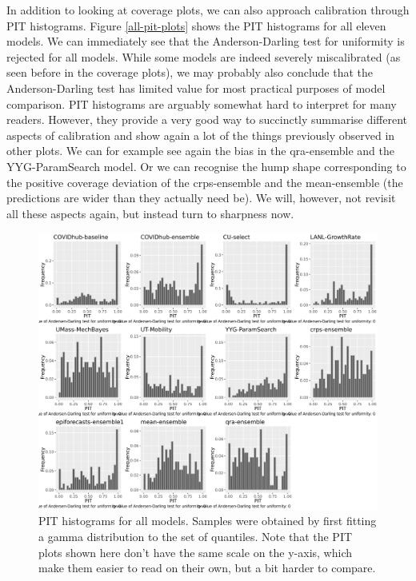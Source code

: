 \documentclass[
]{book}
\begin{document}
In addition to looking at coverage plots, we can also approach calibration through PIT histograms. Figure \ref{all-pit-plots} shows the PIT histograms for all eleven models. We can immediately see that the Anderson-Darling test for uniformity is rejected for all models. While some models are indeed severely miscalibrated (as seen before in the coverage plots), we may probably also conclude that the Anderson-Darling test has limited value for most practical purposes of model comparison. PIT histograms are arguably somewhat hard to interpret for many readers. However, they provide a very good way to succinctly summarise different aspects of calibration and show again a lot of the things previously observed in other plots. We can for example see again the bias in the qra-ensemble and the YYG-ParamSearch model. Or we can recognise the hump shape corresponding to the positive coverage deviation of the crps-ensemble and the mean-ensemble (the predictions are wider than they actually need be). We will, however, not revisit all these aspects again, but instead turn to sharpness now.

\begin{figure}
\includegraphics[width=1\linewidth]{../visualisation/chapter-5-results/all-pit-plots} \caption{PIT histograms for all models. Samples were obtained by first fitting a gamma distribution to the set of quantiles. Note that the PIT plots shown here don't have the same scale on the y-axis, which make them easier to read on their own, but a bit harder to compare. }\label{fig:all-pit-plots}
\end{figure}
\end{document}
